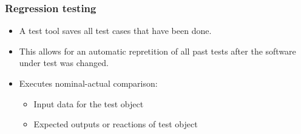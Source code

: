 

\begin{frame}
\frametitle{Regression testing}
\begin{itemize}
  \item A test tool saves all test cases that have been done.
  \item This allows for an automatic repretition of all past tests after the software under test was changed.
  \item Executes nominal-actual comparison:
    \begin{itemize}
      \item Input data for the test object
      \item Expected outputs or reactions of test object
    \end{itemize}
\end{itemize}
\end{frame}




